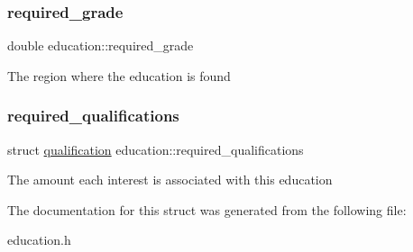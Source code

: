 \subsubsection{\texorpdfstring{required\+\_\+grade}{required\_grade}}
{\footnotesize\ttfamily double education\+::required\+\_\+grade}

The region where the education is found \mbox{\label{structeducation_a0e95ac75d550a79ae7e10e915adb59ac}} 
\subsubsection{\texorpdfstring{required\+\_\+qualifications}{required\_qualifications}}
{\footnotesize\ttfamily struct \hyperlink{structqualification}{qualification} education\+::required\+\_\+qualifications}

The amount each interest is associated with this education 

The documentation for this struct was generated from the following file\+:\begin{DoxyCompactItemize}
\item 
education.\+h\end{DoxyCompactItemize}
